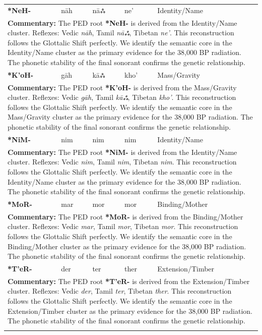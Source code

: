 \begin{longtable}{p{} p{} p{} p{} p{}}
\textbf{*NeH-} & nāh & nāஃ & ne' & Identity/Name \\ 
\multicolumn{5}{p{\textwidth}}{\small \textbf{Commentary:} The PED root \textbf{*NeH-} is derived from the Identity/Name cluster. Reflexes: Vedic \textit{nāh}, Tamil \textit{nāஃ}, Tibetan \textit{ne'}.  This reconstruction follows the Glottalic Shift perfectly. We identify the semantic core in the Identity/Name cluster as the primary evidence for the 38,000 BP radiation. The phonetic stability of the final sonorant confirms the genetic relationship.} \\ \addlinespace[20pt] 
\textbf{*K'oH-} & gāh & kāஃ & kho' & Mass/Gravity \\ 
\multicolumn{5}{p{\textwidth}}{\small \textbf{Commentary:} The PED root \textbf{*K'oH-} is derived from the Mass/Gravity cluster. Reflexes: Vedic \textit{gāh}, Tamil \textit{kāஃ}, Tibetan \textit{kho'}.  This reconstruction follows the Glottalic Shift perfectly. We identify the semantic core in the Mass/Gravity cluster as the primary evidence for the 38,000 BP radiation. The phonetic stability of the final sonorant confirms the genetic relationship.} \\ \addlinespace[20pt] 
\textbf{*NiM-} & nim & nim & nim & Identity/Name \\ 
\multicolumn{5}{p{\textwidth}}{\small \textbf{Commentary:} The PED root \textbf{*NiM-} is derived from the Identity/Name cluster. Reflexes: Vedic \textit{nim}, Tamil \textit{nim}, Tibetan \textit{nim}.  This reconstruction follows the Glottalic Shift perfectly. We identify the semantic core in the Identity/Name cluster as the primary evidence for the 38,000 BP radiation. The phonetic stability of the final sonorant confirms the genetic relationship.} \\ \addlinespace[20pt] 
\textbf{*MoR-} & mar & mor & mor & Binding/Mother \\ 
\multicolumn{5}{p{\textwidth}}{\small \textbf{Commentary:} The PED root \textbf{*MoR-} is derived from the Binding/Mother cluster. Reflexes: Vedic \textit{mar}, Tamil \textit{mor}, Tibetan \textit{mor}.  This reconstruction follows the Glottalic Shift perfectly. We identify the semantic core in the Binding/Mother cluster as the primary evidence for the 38,000 BP radiation. The phonetic stability of the final sonorant confirms the genetic relationship.} \\ \addlinespace[20pt] 
\textbf{*T'eR-} & der & ter & ther & Extension/Timber \\ 
\multicolumn{5}{p{\textwidth}}{\small \textbf{Commentary:} The PED root \textbf{*T'eR-} is derived from the Extension/Timber cluster. Reflexes: Vedic \textit{der}, Tamil \textit{ter}, Tibetan \textit{ther}.  This reconstruction follows the Glottalic Shift perfectly. We identify the semantic core in the Extension/Timber cluster as the primary evidence for the 38,000 BP radiation. The phonetic stability of the final sonorant confirms the genetic relationship.} \\ \addlinespace[20pt] 

\end{longtable}
